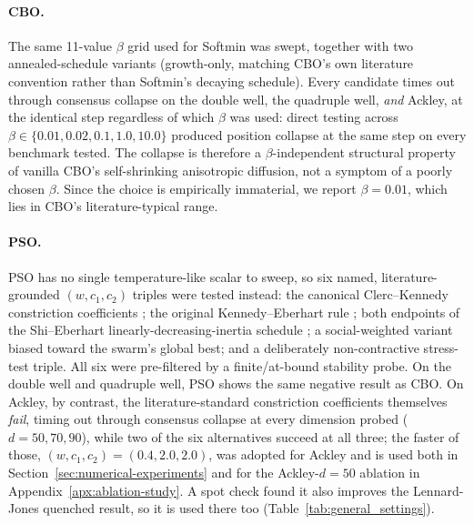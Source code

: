 \documentclass{opt2026} %
\begin{document}
\paragraph{CBO.} The same 11-value $\beta$ grid used for Softmin was swept, together with two annealed-schedule variants (growth-only, matching CBO's own literature convention rather than Softmin's decaying schedule). Every candidate times out through consensus collapse on the double well, the quadruple well, \emph{and} Ackley, at the identical step regardless of which $\beta$ was used: direct testing across $\beta\in\{0.01,0.02,0.1,1.0,10.0\}$ produced position collapse at the same step on every benchmark tested. The collapse is therefore a $\beta$-independent structural property of vanilla CBO's self-shrinking anisotropic diffusion, not a symptom of a poorly chosen $\beta$. Since the choice is empirically immaterial, we report $\beta=0.01$, which lies in CBO's literature-typical range.

\paragraph{PSO.} PSO has no single temperature-like scalar to sweep, so six named, literature-grounded $(w,c_1,c_2)$ triples were tested instead: the canonical Clerc--Kennedy constriction coefficients \citep{clerc2002particle}; the original Kennedy--Eberhart rule \citep{kennedy1995particle}; both endpoints of the Shi--Eberhart linearly-decreasing-inertia schedule \citep{shi1998modified}; a social-weighted variant biased toward the swarm's global best; and a deliberately non-contractive stress-test triple. All six were pre-filtered by a finite/at-bound stability probe. On the double well and quadruple well, PSO shows the same negative result as CBO. On Ackley, by contrast, the literature-standard constriction coefficients themselves \emph{fail}, timing out through consensus collapse at every dimension probed ($d=50,70,90$), while two of the six alternatives succeed at all three; the faster of those, $(w,c_1,c_2)=(0.4,2.0,2.0)$, was adopted for Ackley and is used both in Section~\ref{sec:numerical-experiments} and for the Ackley-$d{=}50$ ablation in Appendix~\ref{apx:ablation-study}. A spot check found it also improves the Lennard-Jones quenched result, so it is used there too (Table~\ref{tab:general_settings}).
\end{document}
